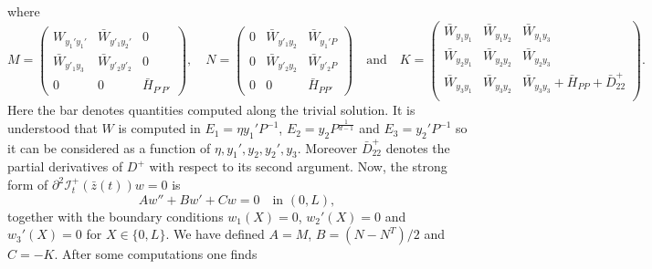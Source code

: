 \documentclass[a4paper,10pt,twoside]{amsbook}
\numberwithin{section}{chapter}
\numberwithin{equation}{chapter}
\theoremstyle{definition}
\begin{document}
where
\[
M=\begin{pmatrix}
    W_{y_1'y_1'} & \bar{W}_{y'_1 y_2'} & 0 \\
    \bar{W}_{y'_1 y_3} & \bar{W}_{y'_2 y'_2} & 0 \\
    0             & 0             & \bar{H}_{P'P'}
\end{pmatrix},\quad
N=\begin{pmatrix}
    0 & \bar{W}_{y'_1 y_2} & \bar{W}_{y_1'P} \\
    0 & \bar{W}_{y'_2 y_2} & \bar{W}_{y'_2P} \\
    0 & 0  & \bar{H}_{PP'}
\end{pmatrix}\quad\text{and}\quad
K=\begin{pmatrix}
    \bar{W}_{y_1y_1} & \bar{W}_{y_1y_2} & \bar{W}_{y_1y_3} \\
    \bar{W}_{y_2y_1} & \bar{W}_{y_2y_2} & \bar{W}_{y_2y_3} \\
    \bar{W}_{y_3y_1} & \bar{W}_{y_3y_2} & \bar{W}_{y_3y_3}+\bar{H}_{PP}+\bar{D}_{22}^+ \\
\end{pmatrix}.
\]
Here the bar denotes quantities computed along the trivial solution. It is understood that $W$ is computed in $E_1=\eta y_1'P^{-1}$, $E_2=y_2P^\frac{1}{d-1}$ and $E_3=y_2'P^{-1}$ so it can be considered as a function of $\eta,y_1',y_2,y_2',y_3$. Moreover $\bar{D}_{22}^+$ denotes the partial derivatives of $D^+$ with respect to its second argument. Now, the strong form of $\partial^2\mathcal{I}_t^+(\bar{z}(t))w=0$ is
\begin{equation}
\label{eqn:2order}
Aw''+Bw'+Cw=0\quad\text{in $(0,L)$},
\end{equation}
together with the boundary conditions $w_1(X)=0$, $w_2'(X)=0$ and $w_3'(X)=0$ for $X\in\{0,L\}$. We have defined $A=M$, $B=(N-N^T)/2$ and $C=-K$. After some computations one finds
\begingroup
\tiny
\end{document}

